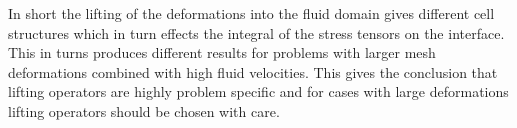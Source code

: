 In short the lifting of the deformations into the fluid domain gives different cell structures which in turn effects the integral of the stress tensors on the interface. This in turns produces different results for problems with larger mesh deformations combined with high fluid velocities. This gives the conclusion that lifting operators are highly problem specific and for cases with large deformations lifting operators should be chosen with care.
\newpage






